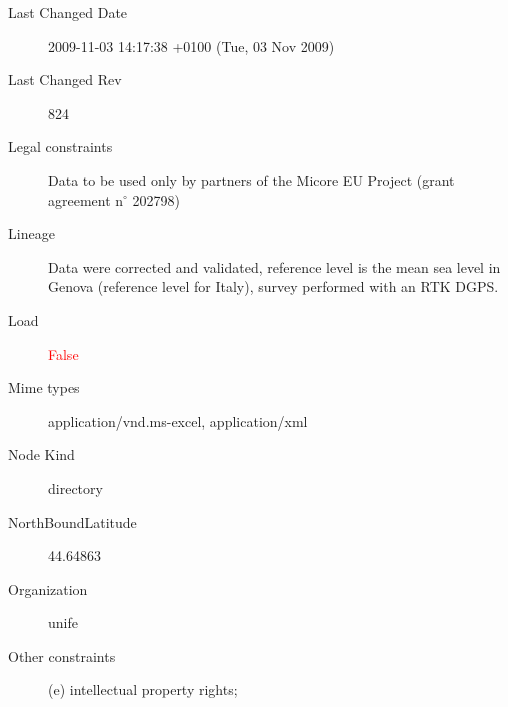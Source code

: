 \documentclass[9]{report}
\begin{document}
\begin{description}
  \item[Last Changed Date] 2009-11-03 14:17:38 +0100 (Tue, 03 Nov 2009)
  \item[Last Changed Rev] 824
  \item[Legal constraints] Data to be used only by partners of the Micore EU Project (grant agreement n\mbox{$^\circ$} 202798)
  \item[Lineage] Data were corrected and validated, reference level is the mean sea level in Genova (reference level for Italy), survey performed with an RTK DGPS.
  \item[Load] \textcolor{red}{False}
  \item[Mime types] application/vnd.ms-excel, application/xml
  \item[Node Kind] directory
  \item[NorthBoundLatitude] 44.64863
  \item[Organization] unife
  \item[Other constraints] (e) intellectual property rights;
  \item[Owner email] \href{mailto:unknown}{unknown}
  \item[Owner organization] 
  \item[Path] /Users/fedorbaart/Documents/checkouts/OpenEarthRawData/trunk/unife/topography/raw/dune foot
  \item[Repository Root] \href{https://repos.deltares.nl/repos/OpenEarthRawData}{https://repos.deltares.nl/repos/OpenEarthRawData}
  \item[Repository UUID] 4427fc4e-80cb-4e17-9138-dc45509d06e2
  \item[Resolution] 7000.0
  \item[Resolution unit] meter
  \item[Revision] 850
  \item[SVN Log] \begin{verbatim}
------------------------------------------------------------------------
r824 | clara.armaroli@unife.it | 2009-11-03 14:17:38 +0100 (Tue, 03 Nov 2009) | 1 line

uploading INSPIRE Metadata
------------------------------------------------------------------------
r823 | clara.armaroli@unife.it | 2009-11-03 14:00:05 +0100 (Tue, 03 Nov 2009) | 1 line

uploading INSPIRE Metadata
------------------------------------------------------------------------
r324 | clara.armaroli@unife.it | 2009-04-21 13:14:21 +0200 (Tue, 21 Apr 2009) | 1 line

moving max run-up and dune foot position into raw data of the topography, previous location was incorrect
------------------------------------------------------------------------
r321 | clara.armaroli@unife.it | 2009-04-21 13:09:00 +0200 (Tue, 21 Apr 2009) | 1 line


\end{verbatim}
\end{description}
\end{document}
